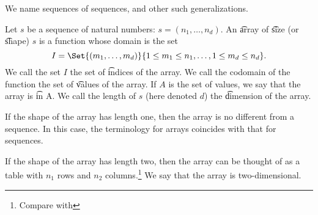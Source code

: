 

We name sequences of sequences, and other such generalizations.


Let $s$ be a sequence of natural numbers: $s = (n_1, \dots, n_d)$.
An \t{array} of \t{size} (or \t{shape}) $s$ is a function whose domain is the set
\[
  I = \Set{(m_1, \dots, m_d)}{ 1 \leq m_1 \leq n_1, \dots, 1 \leq m_d \leq n_d}.
\]
We call the set $I$ the set of \t{indices} of the array.
We call the codomain of the function the set of \t{values} of the array.
If $A$ is the set of values, we say that the array is \t{in} A.
We call the length of $s$ (here denoted $d$) the \t{dimension} of the array.


If the shape of the array has length one, then the array is no different from a sequence.
In this case, the terminology for arrays coincides with that for sequences.


If the shape of the array has length two, then the array can be thought of as a table with $n_1$ rows and $n_2$ columns.\footnote{Compare with }
We say that the array is two-dimensional.

\blankpage
